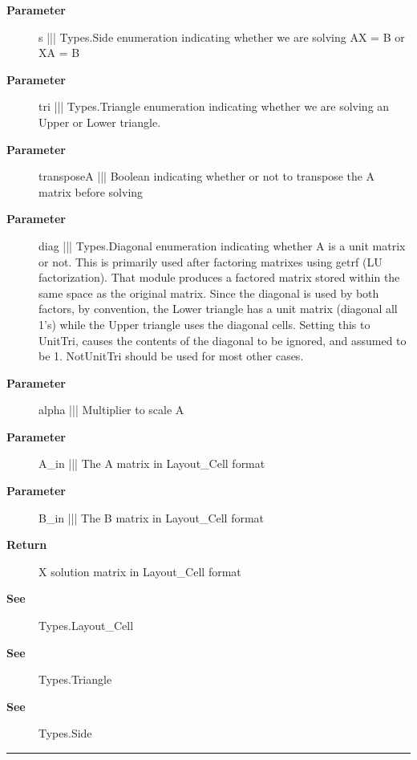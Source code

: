 \par
\begin{description}
\item [\textbf{Parameter}] s ||| Types.Side enumeration indicating whether we are solving AX = B or XA = B
\item [\textbf{Parameter}] tri ||| Types.Triangle enumeration indicating whether we are solving an Upper or Lower triangle.
\item [\textbf{Parameter}] transposeA ||| Boolean indicating whether or not to transpose the A matrix before solving
\item [\textbf{Parameter}] diag ||| Types.Diagonal enumeration indicating whether A is a unit matrix or not. This is primarily used after factoring matrixes using getrf (LU factorization). That module produces a factored matrix stored within the same space as the original matrix. Since the diagonal is used by both factors, by convention, the Lower triangle has a unit matrix (diagonal all 1's) while the Upper triangle uses the diagonal cells. Setting this to UnitTri, causes the contents of the diagonal to be ignored, and assumed to be 1. NotUnitTri should be used for most other cases.
\item [\textbf{Parameter}] alpha ||| Multiplier to scale A
\item [\textbf{Parameter}] A\_in ||| The A matrix in Layout\_Cell format
\item [\textbf{Parameter}] B\_in ||| The B matrix in Layout\_Cell format
\item [\textbf{Return}] X solution matrix in Layout\_Cell format
\item [\textbf{See}] Types.Layout\_Cell
\item [\textbf{See}] Types.Triangle
\item [\textbf{See}] Types.Side
\end{description}

\rule{\linewidth}{0.5pt}
